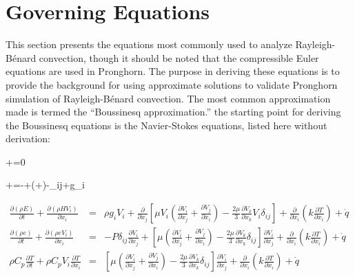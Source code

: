 \documentclass[10pt]{article}
\numberwithin{equation}{section} %
\begin{document}
\clearpage
\section{Governing Equations}
\label{sec:Equations}
This section presents the equations most commonly used to analyze Rayleigh-B\'enard convection, though it should be noted that the compressible Euler equations are used in Pronghorn. The purpose in deriving these equations is to provide the background for using approximate solutions to validate Pronghorn simulation of Rayleigh-B\'enard convection. The most common approximation made is termed the ``Boussinesq approximation.'' the starting point for deriving the Boussinesq equations is the Navier-Stokes equations, listed here without derivation:

\beq
\label{eq:Mass}
+=0
\eeq

\beq
\label{eq:Mom}
+=-+\left\lbrack\mu\left(+\right)-\delta_{ij}\right\rbrack+\rho g_i
\eeq

\begin{subequations}
\label{eq:EnergyNS}
\begin{eqnarray}
\frac{\partial(\rho E)}{\partial t}+\frac{\partial(\rho HV_i)}{\partial x_i}&=&\rho g_iV_i+\frac{\partial}{\partial x_j}\left\lbrack\mu V_i\left(\frac{\partial V_i}{\partial x_j}+\frac{\partial V_j}{\partial x_i}\right)-\frac{2\mu}{3}\frac{\partial V_k}{\partial x_k}V_i\delta_{ij}\right\rbrack+\frac{\partial}{\partial x_i}\left(k\frac{\partial T}{\partial x_i}\right)+\dot{q}\\
\frac{\partial(\rho e)}{\partial t}+\frac{\partial(\rho eV_i)}{\partial x_i}&=&-P\delta_{ij}\frac{\partial V_i}{\partial x_j}+\left\lbrack\mu\left(\frac{\partial V_i}{\partial x_j}+\frac{\partial V_j}{\partial x_i}\right)-\frac{2\mu}{3}\frac{\partial V_k}{\partial x_k}\delta_{ij}\right\rbrack\frac{\partial V_i}{\partial x_j}+\frac{\partial}{\partial x_i}\left(k\frac{\partial T}{\partial x_i}\right)+\dot{q}\hspace{1cm}\\
\rho C_p\frac{\partial T}{\partial t}+\rho C_pV_i\frac{\partial T}{\partial x_i}&=&\left\lbrack\mu\left(\frac{\partial V_i}{\partial x_j}+\frac{\partial V_j}{\partial x_i}\right)-\frac{2\mu}{3}\frac{\partial V_k}{\partial x_k}\delta_{ij}\right\rbrack\frac{\partial V_i}{\partial x_j}+\frac{\partial}{\partial x_i}\left(k\frac{\partial T}{\partial x_i}\right)+\dot{q}
\end{eqnarray}
\end{subequations}
\end{document}
